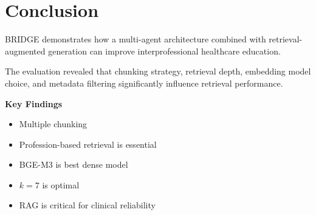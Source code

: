 \documentclass[12pt]{article}
\begin{document}
\section{Conclusion}

BRIDGE demonstrates how a multi-agent architecture combined with retrieval-augmented generation can improve interprofessional healthcare education.

The evaluation revealed that chunking strategy, retrieval depth, embedding model choice, and metadata filtering significantly influence retrieval performance.

\textbf{Key Findings}

\begin{itemize}[leftmargin=1.5em]
    \item Multiple chunking
    \item Profession-based retrieval is essential
    \item BGE-M3 is best dense model
    \item $k = 7$ is optimal
    \item RAG is critical for clinical reliability
\end{itemize}
\end{document}
